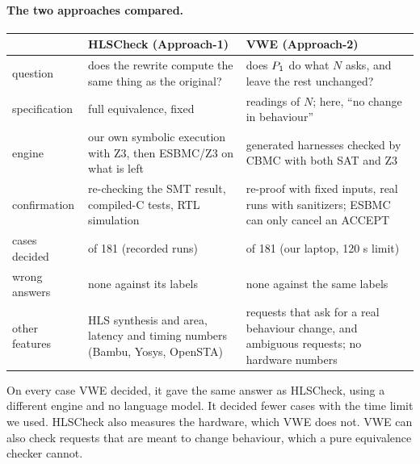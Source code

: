 \documentclass[10pt,a4paper]{article}
\begin{document}
\paragraph{The two approaches compared.}
\begin{center}\small
\noindent\begin{tabularx}{\linewidth}{@{}l>{\raggedright\arraybackslash}X>{\raggedright\arraybackslash}X@{}}\toprule
 & HLSCheck (Approach-1) & VWE (Approach-2)\\\midrule
question & does the rewrite compute the same thing as the original? & does $P_1$ do what $N$ asks, and leave the rest unchanged?\\
specification & full equivalence, fixed & readings of $N$; here, ``no change in behaviour''\\
engine & our own symbolic execution with Z3, then ESBMC/Z3 on what is left & generated harnesses checked by CBMC with both SAT and Z3\\
confirmation & re-checking the SMT result, compiled-C tests, RTL simulation & re-proof with fixed inputs, real runs with sanitizers; ESBMC can only cancel an ACCEPT\\
cases decided & 181 of 181 (recorded runs) & 125 of 181 (our laptop, 120 s limit)\\
wrong answers & none against its labels & none against the same labels\\
other features & HLS synthesis and area, latency and timing numbers (Bambu, Yosys, OpenSTA) & requests that ask for a real behaviour change, and ambiguous requests; no hardware numbers\\\bottomrule
\end{tabularx}\end{center}
On every case VWE decided, it gave the same answer as HLSCheck, using a different engine and no
language model. It decided fewer cases with the time limit we used. HLSCheck also measures the
hardware, which VWE does not. VWE can also check requests that are meant to change behaviour,
which a pure equivalence checker cannot.
\end{document}
